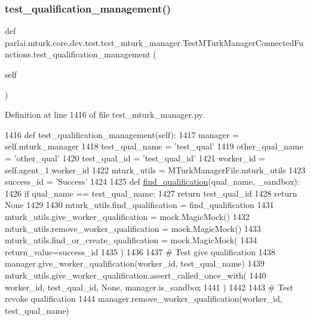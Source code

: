 \subsubsection{\texorpdfstring{test\+\_\+qualification\+\_\+management()}{test\_qualification\_management()}}
{\footnotesize\ttfamily def parlai.\+mturk.\+core.\+dev.\+test.\+test\+\_\+mturk\+\_\+manager.\+Test\+M\+Turk\+Manager\+Connected\+Functions.\+test\+\_\+qualification\+\_\+management (\begin{DoxyParamCaption}\item[{}]{self }\end{DoxyParamCaption})}



Definition at line 1416 of file test\+\_\+mturk\+\_\+manager.\+py.


\begin{DoxyCode}
1416     \textcolor{keyword}{def }test\_qualification\_management(self):
1417         manager = self.mturk\_manager
1418         test\_qual\_name = \textcolor{stringliteral}{'test\_qual'}
1419         other\_qual\_name = \textcolor{stringliteral}{'other\_qual'}
1420         test\_qual\_id = \textcolor{stringliteral}{'test\_qual\_id'}
1421         worker\_id = self.agent\_1.worker\_id
1422         mturk\_utils = MTurkManagerFile.mturk\_utils
1423         success\_id = \textcolor{stringliteral}{'Success'}
1424 
1425         \textcolor{keyword}{def }\hyperlink{namespaceparlai_1_1mturk_1_1core_1_1dev_1_1mturk__utils_acd636315cbbf11cc5d9d641173e51586}{find\_qualification}(qual\_name, \_sandbox):
1426             \textcolor{keywordflow}{if} qual\_name == test\_qual\_name:
1427                 \textcolor{keywordflow}{return} test\_qual\_id
1428             \textcolor{keywordflow}{return} \textcolor{keywordtype}{None}
1429 
1430         mturk\_utils.find\_qualification = find\_qualification
1431         mturk\_utils.give\_worker\_qualification = mock.MagicMock()
1432         mturk\_utils.remove\_worker\_qualification = mock.MagicMock()
1433         mturk\_utils.find\_or\_create\_qualification = mock.MagicMock(
1434             return\_value=success\_id
1435         )
1436 
1437         \textcolor{comment}{# Test give qualification}
1438         manager.give\_worker\_qualification(worker\_id, test\_qual\_name)
1439         mturk\_utils.give\_worker\_qualification.assert\_called\_once\_with(
1440             worker\_id, test\_qual\_id, \textcolor{keywordtype}{None}, manager.is\_sandbox
1441         )
1442 
1443         \textcolor{comment}{# Test revoke qualification}
1444         manager.remove\_worker\_qualification(worker\_id, test\_qual\_name)

\end{DoxyCode}
